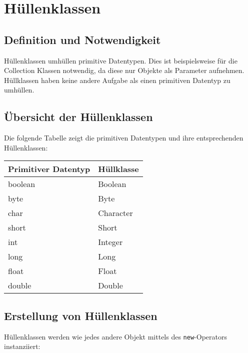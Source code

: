 \chapter{Hüllenklassen}

\section{Definition und Notwendigkeit}
Hüllenklassen umhüllen primitive Datentypen. Dies ist beispielsweise für die
Collection Klassen notwendig, da diese nur Objekte als Parameter aufnehmen.
Hüllklassen haben keine andere Aufgabe als einen primitiven Datentyp zu
umhüllen.

\section{Übersicht der Hüllenklassen}
Die folgende Tabelle zeigt die primitiven Datentypen und ihre entsprechenden
Hüllenklassen:

\begin{center}
    \begin{tabular}{|l|l|}
        \hline
        \textbf{Primitiver Datentyp} & \textbf{Hüllklasse} \\
        \hline\hline
        boolean                      & Boolean             \\
        \hline
        byte                         & Byte                \\
        \hline
        char                         & Character           \\
        \hline
        short                        & Short               \\
        \hline
        int                          & Integer             \\
        \hline
        long                         & Long                \\
        \hline
        float                        & Float               \\
        \hline
        double                       & Double              \\
        \hline
    \end{tabular}
\end{center}

\section{Erstellung von Hüllenklassen}
\label{sec:erstellung_huellenklassen}
Hüllenklassen werden wie jedes andere Objekt mittels des \texttt{new}-Operators instanziiert:

